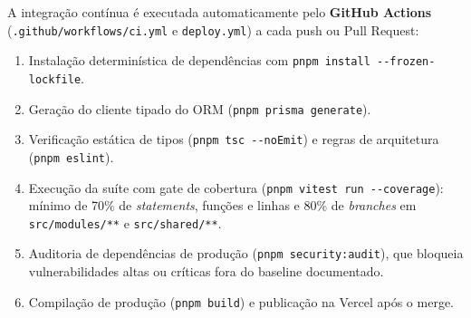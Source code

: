 A integração contínua é executada automaticamente pelo \textbf{GitHub Actions} (\texttt{.\allowbreak\hspace{0pt plus 1pt}github/\allowbreak\hspace{0pt plus 1pt}workflows/\allowbreak\hspace{0pt plus 1pt}ci.\allowbreak\hspace{0pt plus 1pt}yml} e \texttt{deploy.yml}) a cada push ou Pull Request:

\begin{enumerate}
\item Instalação determinística de dependências com \texttt{pnpm \allowbreak\hspace{0pt plus 1pt}install \allowbreak\hspace{0pt plus 1pt}-\allowbreak\hspace{0pt plus 1pt}-\allowbreak\hspace{0pt plus 1pt}frozen-\allowbreak\hspace{0pt plus 1pt}lockfile}.
\item Geração do cliente tipado do ORM (\texttt{pnpm \allowbreak\hspace{0pt plus 1pt}prisma \allowbreak\hspace{0pt plus 1pt}generate}).
\item Verificação estática de tipos (\texttt{pnpm \allowbreak\hspace{0pt plus 1pt}tsc \allowbreak\hspace{0pt plus 1pt}-\allowbreak\hspace{0pt plus 1pt}-\allowbreak\hspace{0pt plus 1pt}noEmit}) e regras de arquitetura (\texttt{pnpm \allowbreak\hspace{0pt plus 1pt}eslint}).
\item Execução da suíte com gate de cobertura (\texttt{pnpm \allowbreak\hspace{0pt plus 1pt}vitest \allowbreak\hspace{0pt plus 1pt}run \allowbreak\hspace{0pt plus 1pt}-\allowbreak\hspace{0pt plus 1pt}-\allowbreak\hspace{0pt plus 1pt}coverage}): mínimo de 70\% de \emph{statements}, funções e linhas e 80\% de \emph{branches} em \texttt{src/\allowbreak\hspace{0pt plus 1pt}modules/\allowbreak\hspace{0pt plus 1pt}**} e \texttt{src/\allowbreak\hspace{0pt plus 1pt}shared/\allowbreak\hspace{0pt plus 1pt}**}.
\item Auditoria de dependências de produção (\texttt{pnpm \allowbreak\hspace{0pt plus 1pt}security:audit}), que bloqueia vulnerabilidades altas ou críticas fora do baseline documentado.
\item Compilação de produção (\texttt{pnpm build}) e publicação na Vercel após o merge.
\end{enumerate}


